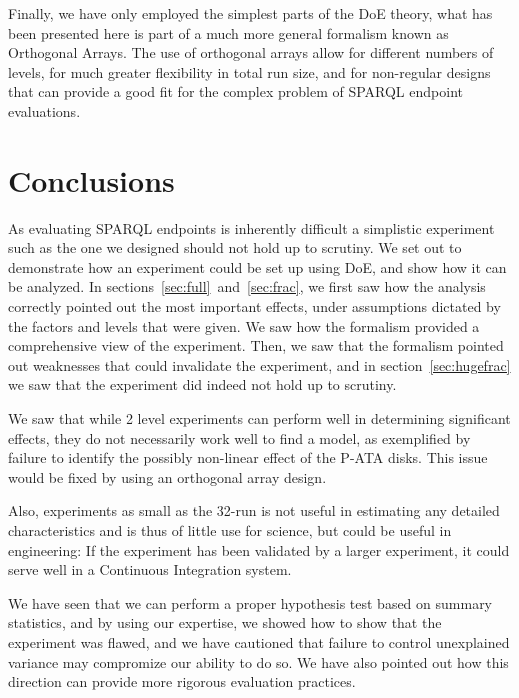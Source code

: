 \documentclass{llncs}
\begin{document}
Finally, we have only employed the simplest parts of the DoE
theory, what has been presented here is part of a much more general
formalism known as Orthogonal Arrays. The use of orthogonal arrays
allow for different numbers of levels, for much greater flexibility in
total run size, and for non-regular designs that can provide a good fit
for the complex problem of SPARQL endpoint evaluations. 

\section{Conclusions}

As evaluating SPARQL endpoints is inherently difficult a simplistic
experiment such as the one we designed should not hold up to
scrutiny. We set out to demonstrate how an experiment could be set up
using DoE, and show how it can be analyzed. In
sections~\ref{sec:full}~and~\ref{sec:frac}, we first saw how the
analysis correctly pointed out the most important effects, under
assumptions dictated by the factors and levels that were given. We saw
how the formalism provided a comprehensive view of the
experiment. Then, we saw that the formalism pointed out weaknesses
that could invalidate the experiment, and in
section~\ref{sec:hugefrac} we saw that the experiment did indeed not
hold up to scrutiny.

We saw that while 2 level experiments can perform well in determining
significant effects, they do not necessarily work well to find a
model, as exemplified by failure to identify the possibly non-linear
effect of the P-ATA disks. This issue would be fixed by using an
orthogonal array design.

Also, experiments as small as the 32-run is not useful in estimating
any detailed characteristics and is thus of little use for science,
but could be useful in engineering: If the experiment has been
validated by a larger experiment, it could serve well in a Continuous
Integration system.

We have seen that we can perform a proper hypothesis test based on
summary statistics, and by using our expertise, we showed how to show
that the experiment was flawed, and we have cautioned that failure to
control unexplained variance may compromize our ability to do so. We
have also pointed out how this direction can provide more rigorous
evaluation practices.
\end{document}

